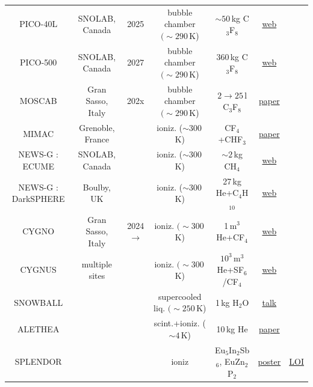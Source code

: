 \begin{table}[!t]
\begin{center}
{\begin{tabular}{ccccccc}
 {\sc PICO-40L} & SNOLAB, Canada & 2025 &    bubble chamber $(\sim 290\,$K) & $\sim50\,$kg C${}_3$F${}_8$ & \href{http://www.picoexperiment.com}{web} & \cite{PICO-40L}
 \\
 
 {\sc PICO-500} & SNOLAB, Canada & 2027 &    bubble chamber $(\sim 290\,$K) & $360\,$kg C${}_3$F${}_8$ & \href{http://www.picoexperiment.com}{web} & \cite{PICO-500}
 \\

 {\sc MOSCAB} & Gran Sasso, Italy & 202x &    bubble chamber $(\sim 290\,$K) & $2\to25\,$l C${}_3$F${}_8$ & \href{https://doi.org/10.1140/epjc/s10052-017-5313-8}{paper} & \cite{1708.00101}\\
 
  {\sc MIMAC} & Grenoble, France &  &    ioniz. ($\sim 300\,$K) & CF${}_4$+CHF${}_3$ & \href{https://doi.org/10.1088/1742-6596/309/1/012014}{paper} & \cite{MIMAC}\\

  {\sc NEWS-G : ECUME} & SNOLAB, Canada &  & ioniz. ($\sim 300\,$K)  & $\sim2\,$kg CH${}_4$ & \href{https://www.queensu.ca/physics/news-g//}{web} & \cite{NEWS-G:SNOGLOBE}
 \\

{\sc NEWS-G : DarkSPHERE} & Boulby, UK  &  & ioniz. ($\sim 300\,$K)  & 27\,kg He+C${}_4$H${}_{10}$  & \href{https://www.queensu.ca/physics/news-g//}{web} & \cite{NEWS-G:SNOGLOBE} \\

{\sc CYGNO} & Gran Sasso, Italy  & 2024$\to$ & ioniz. $(\sim 300\,$K) & 1\,m${}^3$ He+CF${}_4$ & \href{https://web.infn.it/cygnus/cygno/}{web} & \cite{CYGNO} \\

{\sc CYGNUS} & multiple sites  &  & ioniz. $(\sim 300\,$K) &  $10^3\,\text{m}^3$ He+SF${}_6$/CF${}_4$ & \href{https://web.infn.it/cygnus/cygno/}{web} & \cite{CYGNUS} \\


{\sc SNOWBALL} &   &  & supercooled liq. $(\sim 250\,$K) & 1\,kg H${}_2$O & \href{https://indico.cern.ch/event/782953/contributions/3455046/attachments/1889511/3115839/snowball_dpf-compressed.pdf}{talk} & \cite{1807.09253} \\

{\sc ALETHEA} &   &  & scint.+ioniz. ($\sim 4\,$K) & 10\,kg He & \href{https://arxiv.org/pdf/2209.02320}{paper} & \cite{2103.02161} \\

{\sc SPLENDOR} &   &  & ioniz  & Eu${}_5$In${}_2$Sb${}_6$, EuZn${}_2$P${}_2$  & \href{https://indico.cern.ch/event/1188759/contributions/5258739/attachments/2617310/4524195/splendor_poster_ucladm2023.pdf}{poster} & \href{https://www.snowmass21.org/docs/files/summaries/CF/SNOWMASS21-CF1_CF2-IF1_IF2_Kurinsky-029.pdf}{LOI} \\


\end{tabular}}
\end{center}
\end{table}
